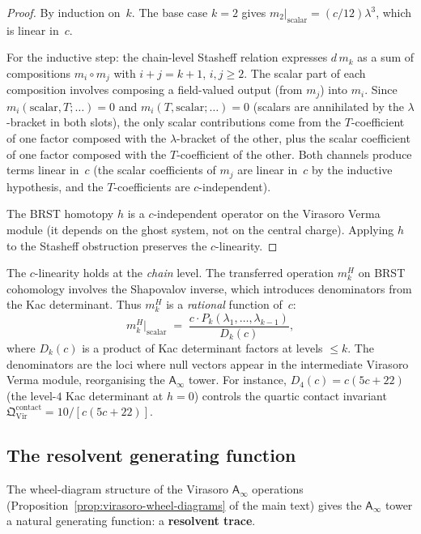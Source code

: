 \documentclass[11pt]{article}
\newcommand{\Ainf}{\mathsf{A}_{\infty}}
\begin{document}
\begin{proof}
By induction on~$k$.  The base case $k = 2$ gives
$m_2|_{\text{scalar}} = (c/12)\lambda^3$, which is
linear in~$c$.

For the inductive step: the chain-level Stasheff relation
expresses $d\,m_k$ as a sum of compositions $m_i \circ m_j$
with $i + j = k + 1$, $i, j \ge 2$.  The scalar part of each
composition involves composing a field-valued output (from $m_j$)
into $m_i$.  Since $m_i(\text{scalar}, T; \ldots) = 0$ and
$m_i(T, \text{scalar}; \ldots) = 0$ (scalars are annihilated
by the $\lambda$-bracket in both slots), the only scalar
contributions come from the $T$-coefficient of one factor
composed with the $\lambda$-bracket of the other, plus the
scalar coefficient of one factor composed with the $T$-coefficient
of the other.  Both channels produce terms linear in~$c$ (the
scalar coefficients of $m_j$ are linear in~$c$ by the inductive
hypothesis, and the $T$-coefficients are $c$-independent).

The BRST homotopy $h$ is a $c$-independent operator on the
Virasoro Verma module (it depends on the ghost system, not
on the central charge).  Applying $h$ to the Stasheff
obstruction preserves the $c$-linearity.
\end{proof}

\begin{remark}
The $c$-linearity holds at the \emph{chain} level.  The
transferred operation $m_k^H$ on BRST cohomology involves
the Shapovalov inverse, which introduces denominators from the
Kac determinant.  Thus $m_k^H$ is a \emph{rational} function
of~$c$:
\[
m_k^H\big|_{\text{scalar}}
\;=\;
\frac{c \cdot P_k(\lambda_1, \ldots, \lambda_{k-1})}
     {D_k(c)},
\]
where $D_k(c)$ is a product of Kac determinant factors at
levels $\le k$.  The denominators are the loci where null
vectors appear in the intermediate Virasoro Verma module,
reorganising the $\Ainf$ tower.  For instance,
$D_4(c) = c(5c + 22)$ (the level-$4$ Kac determinant at $h = 0$)
controls the quartic contact invariant
$\mathfrak{Q}^{\mathrm{contact}}_{\mathrm{Vir}} = 10/[c(5c+22)]$.
\end{remark}

\subsection*{The resolvent generating function}

The wheel-diagram structure of the Virasoro $\Ainf$ operations
(Proposition~\ref{prop:virasoro-wheel-diagrams} of the main text)
gives the $\Ainf$ tower a natural generating function: a
\textbf{resolvent trace}.
\end{document}

